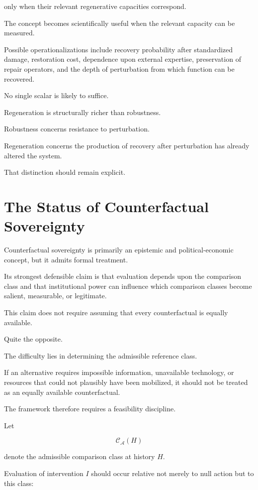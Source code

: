 \documentclass[11pt]{article}
\theoremstyle{remark}
\newcommand{\Adm}{\mathcal{A}}
\begin{document}
only when their relevant regenerative capacities correspond.

The concept becomes scientifically useful when the relevant capacity can be
measured.

Possible operationalizations include recovery probability after standardized
damage, restoration cost, dependence upon external expertise, preservation of
repair operators, and the depth of perturbation from which function can be
recovered.

No single scalar is likely to suffice.

Regeneration is structurally richer than robustness.

Robustness concerns resistance to perturbation.

Regeneration concerns the production of recovery after perturbation has already
altered the system.

That distinction should remain explicit.

\section{The Status of Counterfactual Sovereignty}

Counterfactual sovereignty is primarily an epistemic and political-economic
concept, but it admits formal treatment.

Its strongest defensible claim is that evaluation depends upon the comparison
class and that institutional power can influence which comparison classes
become salient, measurable, or legitimate.

This claim does not require assuming that every counterfactual is equally
available.

Quite the opposite.

The difficulty lies in determining the admissible reference class.

If an alternative requires impossible information, unavailable technology, or
resources that could not plausibly have been mobilized, it should not be treated
as an equally available counterfactual.

The framework therefore requires a feasibility discipline.

Let

\begin{equation}
\mathcal{C}_{\Adm}(H)
\end{equation}

denote the admissible comparison class at history $H$.

Evaluation of intervention $I$ should occur relative not merely to null action
but to this class:
\end{document}

